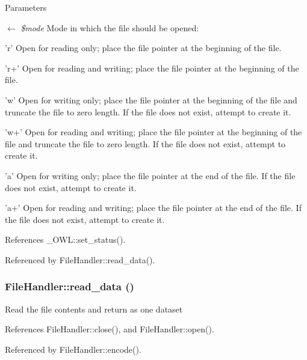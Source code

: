 \begin{DoxyParams}{Parameters}
\item[\mbox{$\leftarrow$} {\em \$mode}]Mode in which the file should be opened:
\begin{DoxyItemize}
\item 'r' Open for reading only; place the file pointer at the beginning of the file.
\item 'r+' Open for reading and writing; place the file pointer at the beginning of the file.
\item 'w' Open for writing only; place the file pointer at the beginning of the file and truncate the file to zero length. If the file does not exist, attempt to create it.
\item 'w+' Open for reading and writing; place the file pointer at the beginning of the file and truncate the file to zero length. If the file does not exist, attempt to create it.
\item 'a' Open for writing only; place the file pointer at the end of the file. If the file does not exist, attempt to create it.
\item 'a+' Open for reading and writing; place the file pointer at the end of the file. If the file does not exist, attempt to create it. 
\end{DoxyItemize}\end{DoxyParams}


References \_\-OWL::set\_\-status().



Referenced by FileHandler::read\_\-data().

\subsubsection[{read\_\-data}]{\setlength{\rightskip}{0pt plus 5cm}FileHandler::read\_\-data ()}\label{classFileHandler_a1389a6ea19a22471c301d70b5ed68ed8}
Read the file contents and return as one dataset 

References FileHandler::close(), and FileHandler::open().



Referenced by FileHandler::encode().

